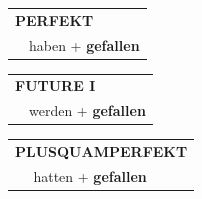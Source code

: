 \documentclass[10pt,a4paper]{revtex4-2}
\begin{document}
\begin{verbbox-dat}
    \vspace{10pt}

 \begin{tabular}{rl}
     \multicolumn{2}{l}{\textbf{PERFEKT}}\\
  &  haben + \textbf{gefallen}\\
  \end{tabular}
\hfill
   \begin{tabular}{rl}
   
    \multicolumn{2}{l}{\textbf{FUTURE I} }\\
  &  werden + \textbf{gefallen}\\
 
  \end{tabular}
\hfill
   \begin{tabular}{rl}
      \multicolumn{2}{l}{\textbf{PLUSQUAMPERFEKT}}\\
   & hatten + \textbf{gefallen}\\
  \end{tabular}
  
  \vspace{-5pt}


\end{verbbox-dat}
\end{document}
